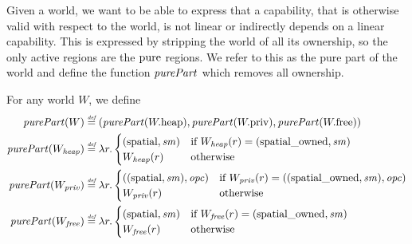 \begin{jversion}
Given a world, we want to be able to express that a capability, that is otherwise valid with respect to the world, is not linear or indirectly depends on a linear capability.
This is expressed by stripping the world of all its ownership, so the only active regions are the $\mathrm{pure}$ regions. We refer to this as the pure part of the world and define the function $\purePart{}$ which removes all ownership.
\begin{definition}
  \label{def:purePart}
  For any world $W$, we define
  \begin{align*}
    \purePart{W} &\defeq (\purePart{\pwheap},\purePart{\pwpriv},\purePart{\pwfree})\\
    \purePart{W_\var{heap}} &\defeq \lambda r\ldotp
                       \begin{cases}
                         (\spatial,\var{sm}) & \text{if } W_\var{heap}(r) = (\spatialo,\var{sm})\\
                         W_{\var{heap}}(r) & \text{otherwise}
                       \end{cases}\\
    \purePart{W_\var{priv}} &\defeq \lambda r\ldotp
                       \begin{cases}
                         ((\spatial,\var{sm}),\opc) & \text{if } W_\var{priv}(r) = ((\spatialo,\var{sm}),\opc)\\
                         W_\var{priv}(r) & \text{otherwise}
                       \end{cases}\\
    \purePart{W_\var{free}} &\defeq \lambda r\ldotp
                       \begin{cases}
                         (\spatial,\var{sm}) & \text{if } W_{\var{free}}(r) = (\spatialo,\var{sm})\\
                         W_{\var{free}}(r) & \text{otherwise}
                       \end{cases}
  \end{align*}
\end{definition}

\end{jversion}
